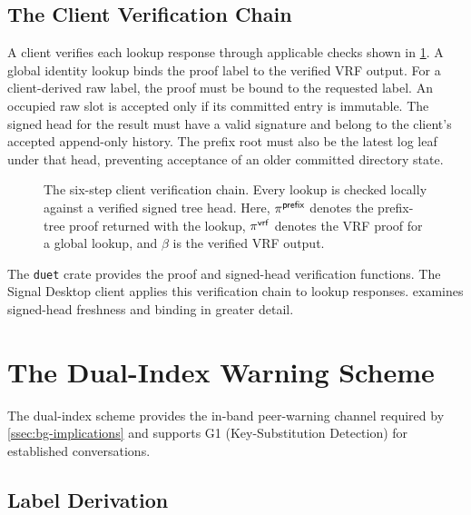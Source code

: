 \subsection{The Client Verification Chain}\label{ssec:design-verify}

A client verifies each lookup response through applicable checks shown in
\cref{fig:design-verify}. A global identity lookup binds the proof label to the verified VRF output.
For a client-derived raw label, the proof must be bound to the requested label. An occupied raw slot is
accepted only if its committed entry is immutable. The signed head for the result must have a valid
signature and belong to the client's accepted append-only history. The prefix root must also be the
latest log leaf under that head, preventing acceptance of an older committed directory state.

\begin{figure}[H]
\centering

\caption[The six-step client verification chain.]{The six-step client verification chain. Every
lookup is checked locally against a verified signed tree head. Here, $\pi^{\mathsf{prefix}}$ denotes the
prefix-tree proof returned with the lookup, $\pi^{\mathsf{vrf}}$ denotes the VRF proof for a global lookup, and
$\beta$ is the verified VRF output.}
\label{fig:design-verify}
\end{figure}

The \texttt{duet} crate provides the proof and signed-head verification functions. The Signal
Desktop client applies this verification chain to lookup responses.
 examines signed-head freshness and binding in greater detail.

\section{The Dual-Index Warning Scheme}\label{sec:design-dual}

The dual-index scheme provides the in-band peer-warning channel required by
\cref{ssec:bg-implications} and supports G1 (Key-Substitution Detection) for established
conversations.

\subsection{Label Derivation}\label{ssec:design-labels}

